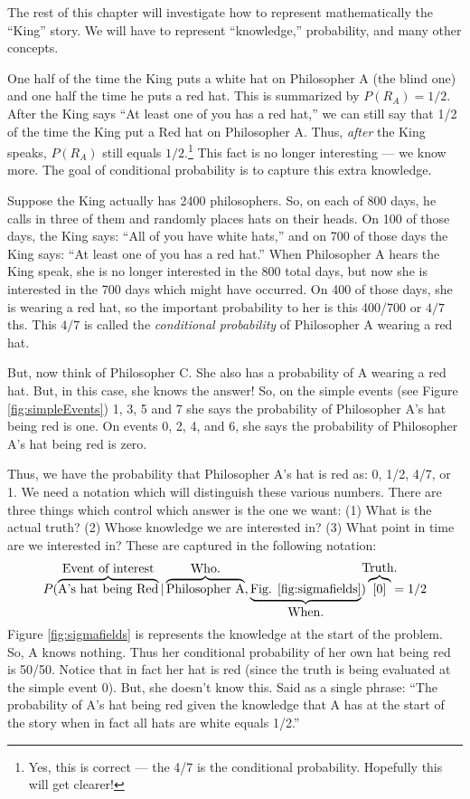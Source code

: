 \documentclass[14pt]{extarticle}
\newcounter{chapter}
\begin{document}
The rest of this chapter will investigate how to represent
mathematically the ``King'' story.  We will have to represent
``knowledge,'' probability, and many other concepts.

\vspace{4ex}


One half of the time the King puts a white hat on Philosopher A (the
blind one) and one half the time he puts a red hat.  This is
summarized by $P(R_A) = 1/2$.  After the King says ``At least one of you
has a red hat,'' we can still say that 1/2 of the time the King put a
Red hat on Philosopher A.  Thus, {\em after} the King speaks, $P(R_A)$
still equals $1/2$.\footnote{Yes, this is correct --- the 4/7 is the
  conditional probability.  Hopefully this will get clearer!}
  This fact is no longer interesting --- we know more.
The goal of conditional probability is to capture this extra
knowledge. 

Suppose the King actually has 2400 philosophers.  So, on each of 800
days, he calls in three of them and randomly places hats on their
heads.  On 100 of those days, the King says: ``All of you have white
hats,'' and on 700 of those days the King says: ``At least one of you
has a red hat.''  When Philosopher A hears the King speak, she is no
longer interested in the 800 total days, but now she is interested in
the 700 days which might have occurred.  On 400 of those days, she is
wearing a red hat, so the important probability to her is this 400/700
or $4/7$ths.  This $4/7$ is called the {\it conditional probability} of
Philosopher A wearing a red hat.

But, now think of Philosopher C.  She also has a probability of A
wearing a red hat.  But, in this case, she knows the answer!  So, on
the simple events (see Figure \ref{fig:simpleEvents}) 1, 3, 5 and 7
she says the probability of Philosopher A's hat being red is one.  On
events 0, 2, 4, and 6, she says the probability of Philosopher A's hat
being red is zero.

Thus, we have the probability that Philosopher A's hat is red as: 0,
1/2, 4/7, or 1.  We need a notation which will distinguish these
various numbers.  There are three things which control which answer is
the one we want: (1) What is the actual truth?  (2) Whose knowledge we
are interested in?  (3) What point in time are we interested in?
These are captured in the following notation:
\begin{displaymath}
  P(\overbrace{\hbox{A's hat being Red}}^{\hbox{Event of interest}} |
  \overbrace{\hbox{Philosopher
      A}}^{\hbox{Who.}},\underbrace{\hbox{Fig.
      \ref{fig:sigmafields}}}_{\hbox{When.}})
  \overbrace{[0]}^{\makebox[0pt][c]{\hbox{Truth.}}} = 1/2
\end{displaymath}
Figure \ref{fig:sigmafields} is represents the knowledge at the start
of the problem.  So, A knows nothing.  Thus her conditional
probability of her own hat being red is 50/50.  Notice that in fact
her hat is red (since the truth is being evaluated at the simple event
0).  But, she doesn't know this.  Said as a single phrase: ``The
probability of A's hat being red given the knowledge that A has at the
start of the story when in fact all hats are white equals 1/2.''
\end{document}
